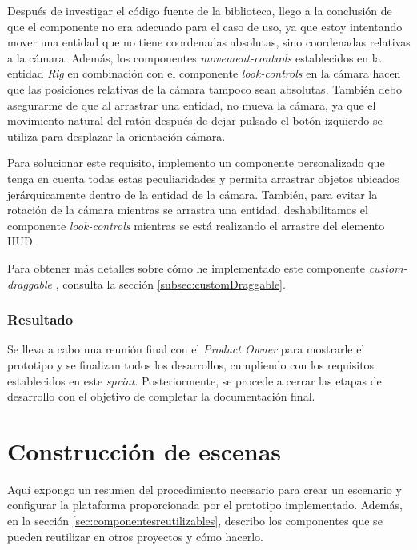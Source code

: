 \documentclass[a4paper, 11pt]{book}
\begin{document}
Después de investigar el código fuente de la biblioteca, llego a la conclusión de que el componente no era adecuado para el caso de uso, ya que estoy intentando mover una entidad que no tiene coordenadas absolutas, sino coordenadas relativas a la cámara. 
Además, los componentes \emph{movement-controls} establecidos en la entidad \emph{Rig} en combinación con el componente \emph{look-controls} en la cámara hacen que las posiciones relativas de la cámara tampoco sean absolutas. También debo asegurarme de que al arrastrar una entidad, no mueva la cámara, ya que el movimiento natural del ratón después de dejar pulsado el botón izquierdo se utiliza para desplazar la orientación cámara.

Para solucionar este requisito, implemento un componente personalizado que tenga en cuenta todas estas peculiaridades y permita arrastrar objetos ubicados jerárquicamente dentro de la entidad de la cámara. También, para evitar la rotación de la cámara mientras se arrastra una entidad, deshabilitamos el componente \emph{look-controls} mientras se está realizando el arrastre del elemento \textsc{\gls{HUD}}.

Para obtener más detalles sobre cómo he implementado este componente \emph{custom-draggable} , consulta la sección \ref{subsec:customDraggable}.

\subsubsection{Resultado}
Se lleva a cabo una reunión final con el \emph{Product Owner} para mostrarle el prototipo y se finalizan todos los desarrollos, cumpliendo con los requisitos establecidos en este \emph{sprint}. Posteriormente, se procede a cerrar las etapas de desarrollo con el objetivo de completar la documentación final. 

\section{Construcción de escenas}
Aquí expongo un resumen del procedimiento necesario para crear un escenario y configurar la plataforma proporcionada por el prototipo implementado. Además, en la sección \ref{sec:componentesreutilizables}, describo los componentes que se pueden reutilizar en otros proyectos y cómo hacerlo.
\end{document}
